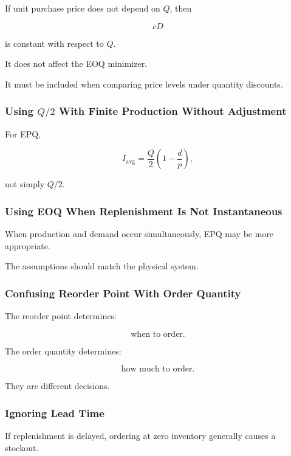If unit purchase price does not depend on \(Q\), then

\[
cD
\]

is constant with respect to \(Q\).

It does not affect the EOQ minimizer.

It must be included when comparing price levels under quantity discounts.

\subsubsection{Using \(Q/2\) With Finite Production Without Adjustment}

For EPQ,

\[
\boxed{
I_{\mathrm{avg}}
=
\frac{Q}{2}
\left(
1-\frac{d}{p}
\right),
}
\]

not simply \(Q/2\).

\subsubsection{Using EOQ When Replenishment Is Not Instantaneous}

When production and demand occur simultaneously, EPQ may be more
appropriate.

The assumptions should match the physical system.

\subsubsection{Confusing Reorder Point With Order Quantity}

The reorder point determines:

\[
\boxed{
\text{when to order}.
}
\]

The order quantity determines:

\[
\boxed{
\text{how much to order}.
}
\]

They are different decisions.

\subsubsection{Ignoring Lead Time}

If replenishment is delayed, ordering at zero inventory generally causes a
stockout.

